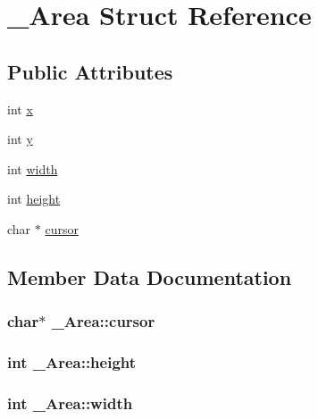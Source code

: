 \hypertarget{struct__Area}{}\section{\+\_\+\+Area Struct Reference}
\label{struct__Area}
\subsection*{Public Attributes}
\begin{DoxyCompactItemize}
\item 
int \hyperlink{struct__Area_a093b8c2929094bac88bbf5ee7db85573}{x}
\item 
int \hyperlink{struct__Area_a867e601f05480db03237c3a17d4c77f8}{y}
\item 
int \hyperlink{struct__Area_aa2f753fc3d254821603ac4512db814f1}{width}
\item 
int \hyperlink{struct__Area_a22627de8e529d631c17157f1f68cb5ac}{height}
\item 
char $\ast$ \hyperlink{struct__Area_aa042b0549789b75fd133b67ad7d0fd9d}{cursor}
\end{DoxyCompactItemize}


\subsection{Member Data Documentation}
\subsubsection[{\texorpdfstring{cursor}{cursor}}]{\setlength{\rightskip}{0pt plus 5cm}char$\ast$ \+\_\+\+Area\+::cursor}\hypertarget{struct__Area_aa042b0549789b75fd133b67ad7d0fd9d}{}\label{struct__Area_aa042b0549789b75fd133b67ad7d0fd9d}
\subsubsection[{\texorpdfstring{height}{height}}]{\setlength{\rightskip}{0pt plus 5cm}int \+\_\+\+Area\+::height}\hypertarget{struct__Area_a22627de8e529d631c17157f1f68cb5ac}{}\label{struct__Area_a22627de8e529d631c17157f1f68cb5ac}
\subsubsection[{\texorpdfstring{width}{width}}]{\setlength{\rightskip}{0pt plus 5cm}int \+\_\+\+Area\+::width}\hypertarget{struct__Area_aa2f753fc3d254821603ac4512db814f1}{}\label{struct__Area_aa2f753fc3d254821603ac4512db814f1}
